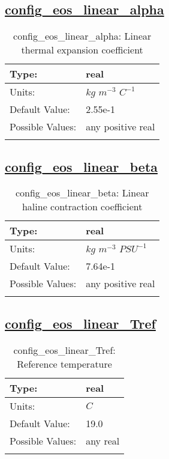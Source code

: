 \subsection[config\_eos\_linear\_alpha]{\hyperref[sec:nm_tab_eos_linear]{config\_eos\_linear\_alpha}}
\label{subsec:nm_sec_config_eos_linear_alpha}
\begin{center}
\begin{longtable}{| p{2.0in} | p{4.0in} |}
    \hline
    Type: & real \\
    \hline
    Units: & $kg$ $m^{-3}$ $C^{-1}$ \\
    \hline
    Default Value: & 2.55e-1 \\
    \hline
    Possible Values: & any positive real \\
    \hline
    \caption{config\_eos\_linear\_alpha: Linear thermal expansion coefficient}
\end{longtable}
\end{center}
\subsection[config\_eos\_linear\_beta]{\hyperref[sec:nm_tab_eos_linear]{config\_eos\_linear\_beta}}
\label{subsec:nm_sec_config_eos_linear_beta}
\begin{center}
\begin{longtable}{| p{2.0in} | p{4.0in} |}
    \hline
    Type: & real \\
    \hline
    Units: & $kg$ $m^{-3}$ $PSU^{-1}$ \\
    \hline
    Default Value: & 7.64e-1 \\
    \hline
    Possible Values: & any positive real \\
    \hline
    \caption{config\_eos\_linear\_beta: Linear haline contraction coefficient}
\end{longtable}
\end{center}
\subsection[config\_eos\_linear\_Tref]{\hyperref[sec:nm_tab_eos_linear]{config\_eos\_linear\_Tref}}
\label{subsec:nm_sec_config_eos_linear_Tref}
\begin{center}
\begin{longtable}{| p{2.0in} | p{4.0in} |}
    \hline
    Type: & real \\
    \hline
    Units: & $C$ \\
    \hline
    Default Value: & 19.0 \\
    \hline
    Possible Values: & any real \\
    \hline
    \caption{config\_eos\_linear\_Tref: Reference temperature}
\end{longtable}
\end{center}
